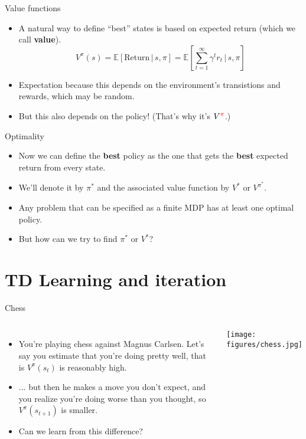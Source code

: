 \documentclass[handout]{beamer} %
\newcommand{\E}[1]{\mathbb{E}\left[#1\right]}
\begin{document}
\begin{frame}{Value functions} 
\begin{itemize}
\item A natural way to define ``best'' states is based on expected return (which we call \textbf{value}). 
    \[V^\pi(s) = \E{\text{Return} \, |\, s, \pi} = \E{\sum_{t=1}^\infty \gamma^t r_t \, \bigg \vert \, s, \pi } \]
\item<2-> Expectation because this depends on the environment's transistions and rewards, which may be random.  
\item<3-> But this also depends on the policy! (That's why it's \(V^{\color{red} \pi}\).) 
\end{itemize}
\end{frame}

\begin{frame}{Optimality}
\begin{itemize}
\item Now we can define the \textbf{best} policy as the one that gets the \textbf{best} expected return from every state.
\item<2-> We'll denote it by \(\pi^*\) and the associated value function by \(V^*\) or \(V^{\pi^*}\). 
\item<3-> Any problem that can be specified as a finite MDP has at least one optimal policy.
\item<4-> But how can we try to find \(\pi^*\) or \(V^*\)?
\end{itemize}
\end{frame}


\section{TD Learning and iteration}
\begin{frame}{Chess}
\begin{columns}
\begin{itemize}
    \item<1-> You're playing chess against Magnus Carlsen. Let's say you estimate that you're doing pretty well, that is \(V^{\pi}(s_t)\) is reasonably high. 
    \item<2-> ... but then he makes a move you don't expect, and you realize you're doing worse than you thought, so \(V^{\pi}(s_{t+1})\) is smaller.
    \item<3-> Can we learn from this difference?
\end{itemize}
    \begin{center}
    \texttt{[image: figures/chess.jpg]}
    \end{center}
\end{columns}
\end{frame}
\end{document}

